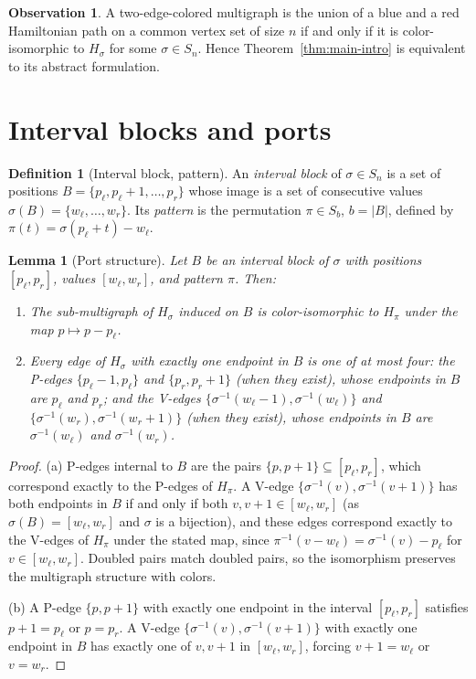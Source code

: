 \documentclass[11pt]{article}
\newtheorem{lemma}[theorem]{Lemma}
\theoremstyle{definition}
\newtheorem{definition}[theorem]{Definition}
\newtheorem{observation}[theorem]{Observation}
\newcommand{\inv}[1]{#1^{-1}}
\begin{document}
\begin{observation}\label{obs:translate}
A two-edge-colored multigraph is the union of a blue and a red Hamiltonian path on a
common vertex set of size $n$ if and only if it is color-isomorphic to $H_\sigma$ for
some $\sigma \in S_n$. Hence Theorem~\ref{thm:main-intro} is equivalent to its
abstract formulation.
\end{observation}

\section{Interval blocks and ports}\label{sec:ports}

\begin{definition}[Interval block, pattern]\label{def:block}
An \emph{interval block} of $\sigma \in S_n$ is a set of positions
$B = \{p_\ell, p_\ell + 1, \dots, p_r\}$ whose image is a set of consecutive values
$\sigma(B) = \{w_\ell, \dots, w_r\}$. Its \emph{pattern} is the permutation
$\pi \in S_b$, $b = |B|$, defined by $\pi(t) = \sigma(p_\ell + t) - w_\ell$.
\end{definition}

\begin{lemma}[Port structure]\label{lem:ports}
Let $B$ be an interval block of $\sigma$ with positions $[p_\ell,p_r]$, values
$[w_\ell,w_r]$, and pattern $\pi$. Then:
\begin{enumerate}
\item[(a)] The sub-multigraph of $H_\sigma$ induced on $B$ is color-isomorphic to
$H_\pi$ under the map $p \mapsto p - p_\ell$.
\item[(b)] Every edge of $H_\sigma$ with exactly one endpoint in $B$ is one of at
most four: the P-edges $\{p_\ell - 1, p_\ell\}$ and $\{p_r, p_r + 1\}$ (when they
exist), whose endpoints in $B$ are $p_\ell$ and $p_r$; and the V-edges
$\{\inv\sigma(w_\ell - 1), \inv\sigma(w_\ell)\}$ and
$\{\inv\sigma(w_r), \inv\sigma(w_r + 1)\}$ (when they exist), whose endpoints in $B$
are $\inv\sigma(w_\ell)$ and $\inv\sigma(w_r)$.
\end{enumerate}
\end{lemma}

\begin{proof}
(a) P-edges internal to $B$ are the pairs $\{p, p+1\} \subseteq [p_\ell, p_r]$, which
correspond exactly to the P-edges of $H_\pi$. A V-edge
$\{\inv\sigma(v), \inv\sigma(v+1)\}$ has both endpoints in $B$ if and only if both
$v, v+1 \in [w_\ell, w_r]$ (as $\sigma(B) = [w_\ell, w_r]$ and $\sigma$ is a
bijection), and these edges correspond exactly to the V-edges of $H_\pi$ under the
stated map, since $\inv\pi(v - w_\ell) = \inv\sigma(v) - p_\ell$ for
$v \in [w_\ell, w_r]$. Doubled pairs match doubled pairs, so the isomorphism
preserves the multigraph structure with colors.

(b) A P-edge $\{p, p+1\}$ with exactly one endpoint in the interval $[p_\ell, p_r]$
satisfies $p + 1 = p_\ell$ or $p = p_r$. A V-edge
$\{\inv\sigma(v), \inv\sigma(v+1)\}$ with exactly one endpoint in $B$ has exactly one
of $v, v+1$ in $[w_\ell, w_r]$, forcing $v + 1 = w_\ell$ or $v = w_r$.
\end{proof}
\end{document}
